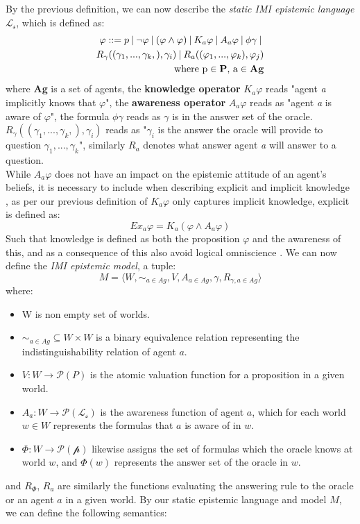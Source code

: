 By the previous definition, we can now describe the \textit{static IMI
	epistemic language} $\mathscr{L_s}$, which is defined as:
\begin{align*}
	\varphi ::= p \:|\:\neg\varphi\:|\:(\varphi \land \varphi) \:|\: K_a\varphi \:|\: A_a\varphi \:|\: \phi\gamma \:|\: \\ R_\gamma((\gamma_1,...,\gamma_k,), \gamma_i) \:|\: R_a((\varphi_1,...,\varphi_k), \varphi_j) \\ \text{where p} \in \text{\textbf{P}}\text{, a} \in \text{\textbf{Ag}}
\end{align*}
where \textbf{Ag} is a set of agents, the \textbf{knowledge operator} $K_a\varphi$ reads "agent \textit{a} implicitly knows that $\varphi$", the \textbf{awareness operator} $A_a\varphi$ reads as "agent \textit{a} is aware of $\varphi$", the formula $\phi\gamma$ reads as $\gamma$ is in the answer set of the oracle. $R_\gamma((\gamma_1,...,\gamma_k,), \gamma_i)$ reads as "$\gamma_i$ is the answer the oracle will provide to question $\gamma_1,...,\gamma_k$", similarly $R_a$ denotes what answer agent \textit{a} will answer to a question. \\
While $A_a\varphi$ does not have an impact on the epistemic attitude of an agent's beliefs, it is necessary to include when describing explicit and implicit knowledge \cite{delimi}, as per our previous definition of $K_a\varphi$ only captures implicit knowledge, explicit is defined as:
$$
	Ex_a\varphi = K_a(\varphi \land A_a\varphi)
$$
Such that knowledge is defined as both the proposition $\varphi$ and the awareness of this, and as a consequence of this also avoid logical omniscience \cite{fagin87}\cite{vanbenthem2010}. We can now define the \textit{IMI epistemic model}, a tuple:
$$
	M = \langle W, \sim_{a\in Ag}, V, A_{a\in Ag}, \gamma, R_{\gamma,a\in Ag}\rangle
$$
where:
\begin{itemize}
	\setlength\itemsep{-0.4em}
	\item W is non empty set of worlds.
	\item $\sim_{a\in Ag} \subseteq W \times W$ is a binary equivalence relation representing the indistinguishability relation of agent $a$.
	\item $V : W \rightarrow \mathscr{P}(P)$ is the atomic valuation function for a proposition in a given world.
	\item $A_a : W \rightarrow \mathscr{P}(\mathscr{L_s})$ is the awareness function of agent $a$, which for each world $w \in W$ represents the formulas that $a$ is aware of in $w$.
	\item $\Phi : W \rightarrow \mathscr{P}(\mathscr{p}) $ likewise assigns the set of formulas which the oracle knows at world $w$, and $\Phi(w)$ represents the answer set of the oracle in $w$.
\end{itemize}
and $R_{\Phi}$, $R_{a}$ are similarly the functions evaluating the answering rule to the oracle or an agent $a$ in a given world. By our static epistemic language \staticlang and model $M$, we can define the following semantics:

